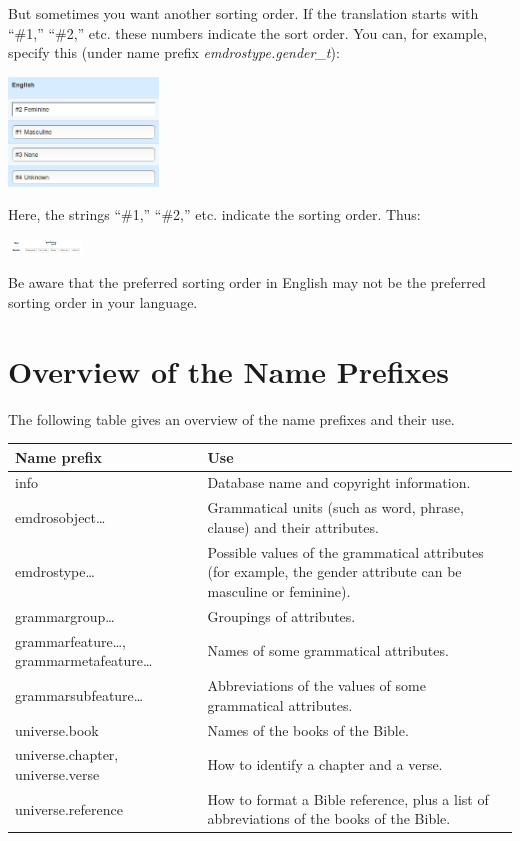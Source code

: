 \documentclass[11pt,oneside,a4paper]{memoir}
\newcommand{\headii}[2]{\textbf{#1} & \textbf{#2}}
\begin{document}
But sometimes you want another sorting order. If the translation starts with ``\#1,'' ``\#2,'' etc.
these numbers indicate the sort order. You can, for example, specify this (under name prefix
\emph{emdrostype.gender\_t}):

\begin{center}
  \includegraphics[width=0.3\textwidth]{gendertranslate.png}
\end{center}

Here, the strings ``\#1,'' ``\#2,'' etc. indicate the sorting order. Thus:

\begin{center}
  \includegraphics[width=0.148\textwidth]{gender.png}
\end{center}

Be aware that the preferred sorting order in English may not be the preferred sorting order in your language.

\section{Overview of the Name Prefixes}


The following table gives an overview of the name prefixes and their use.

\begin{tabularx}{\textwidth}{@{}>{\footnotesize\ttfamily} l X @{}}
  \toprule
  \headii{\normalsize\textrm{Name prefix}}{Use}\\
  \midrule
  
  info & Database name and copyright information. \\
  emdrosobject\ldots & Grammatical units (such as word, phrase, clause) and their attributes.\\
  emdrostype\ldots & Possible values of the grammatical attributes (for example, the gender
  attribute can be masculine or feminine). \\
  grammargroup\ldots & Groupings of attributes. \\
  grammarfeature\ldots{}, grammarmetafeature\ldots & Names of some grammatical
  attributes. \\
  grammarsubfeature\ldots & Abbreviations of the values of some grammatical attributes. \\
  universe.book& Names of the books of the Bible. \\
  universe.chapter, universe.verse & How to identify a chapter and a verse. \\
  universe.reference & How to format a Bible reference, plus a list of abbreviations of the books of
  the Bible.\\
  
  \bottomrule
\end{tabularx}
\end{document}
